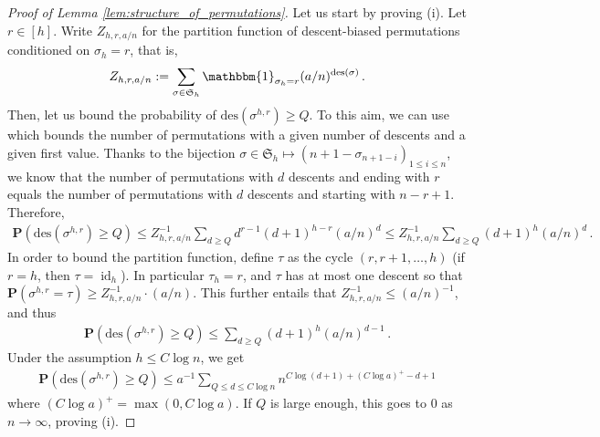 \documentclass{article}
\theoremstyle{remark}
\newcommand{\fS}{\mathfrak{S}}
\newcommand{\prob}[1]{\mathbf{P}{\left(#1\right)}}
\newcommand{\One}[1]{\mathbbm{1}_{#1}}
\newcommand{\des}[1]{{\mathrm{des}{\left(#1\right)}}}
\DeclareMathOperator{\id}{id}
\begin{document}
\begin{proof}[Proof of Lemma \ref{lem:structure_of_permutations}]
Let us start by proving (i). 
Let $r\in[h]$.
Write $Z_{h,r,a/n}$ for the partition function of descent-biased permutations conditioned on $\sigma_h=r$, that is,
\begin{equation*}
    Z_{h,r,a/n} := \sum_{\sigma\in\fS_h} \One{\sigma_h=r} (a/n)^{\des{\sigma}} \,.
\end{equation*}
Then, let us bound the probability of $\des{\sigma^{h,r}}\ge Q$.
To this aim, we can use \cite[Corollary~16~(ii)]{Thevenin_Wagner_2023} which bounds the number of permutations with a given number of descents and a given first value.
Thanks to the bijection $\sigma\in\fS_h \mapsto \left( n+1-\sigma_{n+1-i} \right)_{1\le i\le n}$, we know that the number of permutations with $d$ descents and ending with $r$ equals the number of permutations with $d$ descents and starting with $n-r+1$.
Therefore,
\begin{align*}
    \prob{\des{\sigma^{h,r}}\ge Q}
    \le Z_{h,r,a/n}^{-1} \sum_{d\ge Q} d^{r-1} (d+1)^{h-r} (a/n)^d
    \le Z_{h,r,a/n}^{-1} \sum_{d\ge Q} (d+1)^{h} (a/n)^d \,.
\end{align*}
In order to bound the partition function, define $\tau$ as the cycle $(r,r+1, \dots, h)$ (if $r=h$, then $\tau=\id_h$).
In particular $\tau_{h}=r$, and $\tau$ has at most one descent so that $\prob{\sigma^{h,r} = \tau} \ge Z_{h,r,a/n}^{-1} \cdot (a/n)$. 
This further entails that $Z_{h,r,a/n}^{-1} \le (a/n)^{-1}$, and thus
\begin{align*}
    \prob{\des{\sigma^{h,r}}\ge Q}
    \le \sum_{d\ge Q} (d+1)^{h} (a/n)^{d-1} \,.
\end{align*}
Under the assumption $h\le C\log n$, we get
\begin{align*}
    \prob{\des{\sigma^{h,r}}\ge Q} 
    \le a^{-1} \sum_{Q\le d\le C\log n} n^{C\log(d+1) + (C\log a)^+ - d + 1}
\end{align*}
where $(C\log a)^+ = \max(0, C\log a)$.
If $Q$ is large enough, this goes to $0$ as $n\to\infty$, proving (i).


\end{proof}
\end{document}
